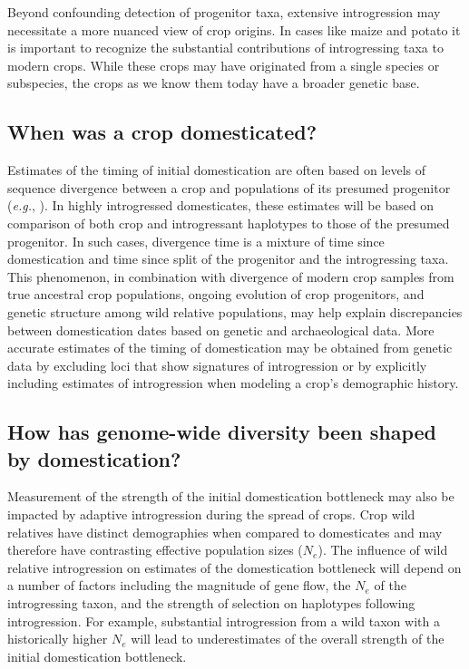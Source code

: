 \documentclass[11pt]{article}
\begin{document}
Beyond confounding detection of progenitor taxa, extensive introgression may necessitate a more nuanced view of crop origins.
In cases like maize and potato it is important to recognize the substantial contributions of introgressing taxa to modern crops.
While these crops may have originated from a single species or subspecies, the crops as we know them today have a broader genetic base.

\subsection*{When was a crop domesticated?}
Estimates of the timing of initial domestication are often based on levels of sequence divergence between a crop and populations of its presumed progenitor (\emph{e.g.}, \cite{matsuoka2002single, molina2011molecular}).
In highly introgressed domesticates, these estimates will be based on comparison of both crop and introgressant haplotypes to those of the presumed progenitor.
In such cases, divergence time is a mixture of time since domestication and time since split of the progenitor and the introgressing taxa.
This phenomenon, in combination with divergence of modern crop samples from true ancestral crop populations, ongoing evolution of crop progenitors, and genetic structure among wild relative populations, may help explain discrepancies between domestication dates based on genetic and archaeological data.
More accurate estimates of the timing of domestication may be obtained from genetic data by excluding loci that show signatures of introgression or by explicitly including estimates of introgression when modeling a crop's demographic history.

\subsection*{How has genome-wide diversity been shaped by domestication?}

Measurement of the strength of the initial domestication bottleneck may also be impacted by adaptive introgression during the spread of crops.
Crop wild relatives have distinct demographies when compared to domesticates and may therefore have contrasting effective population sizes ($N_e$).
The influence of wild relative introgression on estimates of the domestication bottleneck will depend on a number of factors including the magnitude of gene flow, the $N_e$ of the introgressing taxon, and the strength of selection on haplotypes following introgression.
For example, substantial introgression from a wild taxon with a historically higher $N_e$ will lead to underestimates of the overall strength of the initial domestication bottleneck.
\end{document}
